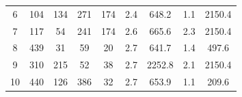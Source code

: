 \begin{table}[ht!]
\begin{tabular}{ccccccccc}
		\multicolumn{1}{c|}{6}               & 104                                                          & 134                                                               & 271                                                              & \multicolumn{1}{c|}{174}                                                              & 2.4                                                           & 648.2                                                              & 1.1                                                               & 2150.4                                                            \\
		\multicolumn{1}{c|}{7}               & 117                                                          & 54                                                                & 241                                                              & \multicolumn{1}{c|}{174}                                                              & 2.6                                                           & 665.6                                                              & 2.3                                                               & 2150.4                                                            \\
		\multicolumn{1}{c|}{8}               & 439                                                          & 31                                                                & 59                                                               & \multicolumn{1}{c|}{20}                                                               & 2.7                                                           & 641.7                                                              & 1.4                                                               & 497.6                                                             \\
		\multicolumn{1}{c|}{9}               & 310                                                          & 215                                                               & 52                                                               & \multicolumn{1}{c|}{38}                                                               & 2.7                                                           & 2252.8                                                             & 2.1                                                               & 2150.4                                                            \\
		\multicolumn{1}{c|}{10}              & 440                                                          & 126                                                               & 386                                                              & \multicolumn{1}{c|}{32}                                                               & 2.7                                                           & 653.9                                                              & 1.1                                                               & 209.6                                                             \\ \hline

\end{tabular}
\end{table}
